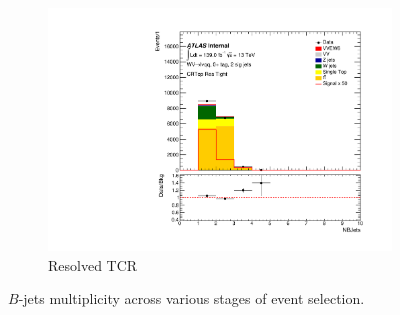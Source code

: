 \begin{figure}[ht]
\begin{subfigure}{0.32\textwidth}
        \includegraphics[width=\linewidth]{figures/CRPlots/CRTop_Res_Tight/stacked_plot_NBJets.pdf}
        \caption{Resolved TCR}
    \end{subfigure}
    \caption{$B$-jets multiplicity across various stages of event selection.}
    \label{fig:1lepNBjetsPresel}
\end{figure}

